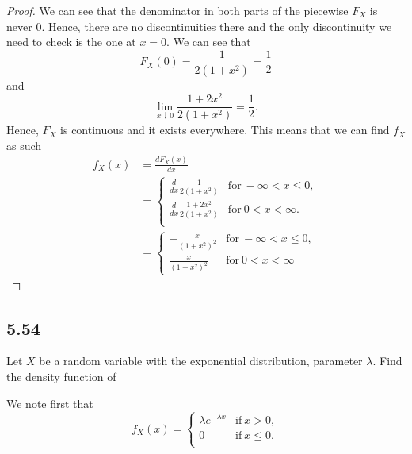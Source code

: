 \documentclass{article}
\newcommand{\deriv}[2]{\frac{d #1}{d#2}}
\begin{document}
\begin{proof}
    We can see that the denominator in both parts of the piecewise $F_X$ is never
    $0$. Hence, there are no discontinuities there and the only discontinuity we
    need to check is the one at $x = 0$. We can see that
    \begin{equation*}
        F_X(0) = \frac{1}{2(1 + x^2)} = \frac{1}{2}
    \end{equation*}
    and
    \begin{equation*}
        \lim_{x\downarrow 0} \frac{1 + 2x^2}{2(1 + x^2)} = \frac{1}{2}.
    \end{equation*}
    Hence, $F_X$ is continuous and it exists everywhere.
    This means that we can find $f_X$ as such
    \begin{align*}
        f_X(x) & = \deriv{F_X(x)}{x}                                                       \\
               & = \begin{cases}
                       \deriv{}{x}\frac{1}{2(1 + x^2)}      & \text{for} \ -\infty < x \leq 0, \\
                       \deriv{}{x}\frac{1 + 2x^2}{2(1+x^2)} & \text{for} \ 0 < x < \infty.     \\
                   \end{cases} \\
               & = \begin{cases}
                       -\frac{x}{(1 + x^2)^2} & \text{for} \ -\infty < x \leq 0, \\
                       \frac{x}{(1+x^2)^2}    & \text{for} \ 0 < x < \infty
                   \end{cases}
    \end{align*}
\end{proof}

\subsection*{5.54} %
Let $X$ be a random variable with the exponential distribution, parameter $\lambda$.
Find the density function of

We note first that
\begin{equation*}
    f_X(x) = \begin{cases}
        \lambda e^{-\lambda x} & \text{if} \ x > 0,    \\
        0                      & \text{if} \ x \leq 0. \\
    \end{cases}
\end{equation*}
\end{document}
